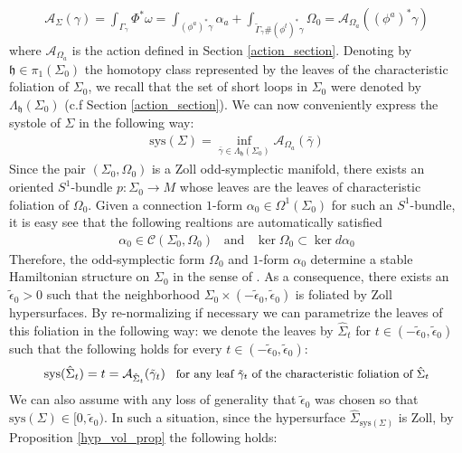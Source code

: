 \documentclass[11pt]{amsart}
\theoremstyle{plain}
\theoremstyle{definition}
\theoremstyle{remark}
\begin{document}
\begin{align}
    \mathcal{A}_{\Sigma}(\gamma) = \int_{\Gamma_{\gamma}}\Phi^*\omega = \int_{(\phi^a)^*\gamma} \alpha_a + \int_{\tilde \Gamma_{\gamma} \# (\phi^t)^*\gamma} \Omega_0 = \mathcal{A}_{\Omega_a}((\phi^a)^*\gamma)
\end{align}
where $\mathcal{A}_{\Omega_a}$ is the action defined in Section \ref{action_section}. Denoting by $\mathfrak{h} \in \pi_1(\Sigma_0)$ the homotopy class represented by the leaves of the characteristic foliation of $\Sigma_0$, we recall that the set of short loops in $\Sigma_0$ were denoted by $\Lambda_{\mathfrak{h}}(\Sigma_0)$ (c.f Section \ref{action_section}). We can now conveniently express the systole of $\Sigma$ in the following way:
\begin{align}\label{sys_in_odd-symp}
    \text{sys}(\Sigma)= \inf_{\bar \gamma \in \Lambda_{\mathfrak{h}}(\Sigma_0)} \mathcal{A}_{\Omega_a}(\bar \gamma)
\end{align}
Since the pair $(\Sigma_0,\Omega_0)$ is a Zoll odd-symplectic manifold, there exists an oriented $S^1$-bundle $p: \Sigma_0 \rightarrow M$ whose leaves are the leaves of characteristic foliation of $\Omega_0$. Given a connection $1$-form $\alpha_0 \in \Omega^1(\Sigma_0)$ for such an $S^1$-bundle, it is easy see that the following realtions are automatically satisfied
\begin{align}
  \alpha_0 \in \mathcal{C}(\Sigma_0,\Omega_0) \;\;\; \text{and} \;\;\;  \ker \Omega_0 \subset \ker d\alpha_0
\end{align}
Therefore, the odd-symplectic form $\Omega_0$ and $1$-form $\alpha_0$ determine a stable Hamiltonian structure on $\Sigma_0$ in the sense of \cite{CieliebakFrauenfelderPaternain2010}. As a consequence, there exists an $\tilde \epsilon_0 >0$ such that the neighborhood $\Sigma_0 \times (-\tilde\epsilon_0,\tilde \epsilon_0)$ is foliated by Zoll hypersurfaces. By re-normalizing if necessary we can parametrize the leaves of this foliation in the following way: we denote the leaves by $\hat{\Sigma}_t$ for $t \in (-\tilde\epsilon_0,\tilde \epsilon_0)$ such that the following holds for every $t \in  (-\tilde\epsilon_0,\tilde \epsilon_0)$:
\begin{align}
    \text{sys}(\hat{\Sigma}_t) = t = \mathcal{A}_{\hat{\Sigma}_t}(\tilde\gamma_t) \;\;\; \text{\small for any leaf $\tilde \gamma_t$ of the characteristic foliation of $\hat{\Sigma}_t$}
\end{align}
We can also assume with any loss of generality that $\tilde \epsilon_0$ was chosen so that $\text{sys}(\Sigma) \in [0,\tilde\epsilon_0)$. In such a situation, since the hypersurface $\hat{\Sigma}_{\text{sys}(\Sigma)}$ is Zoll, by Proposition \ref{hyp_vol_prop} the following holds:
\end{document}
